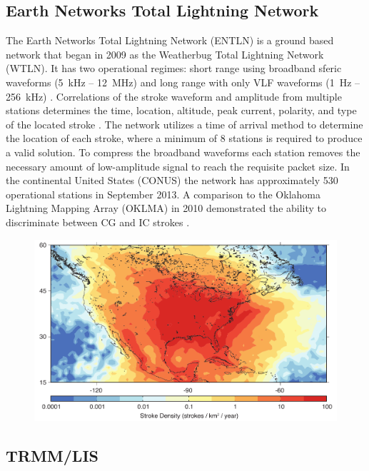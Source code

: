 \subsection{Earth Networks Total Lightning Network}

The Earth Networks Total Lightning Network (ENTLN) is a ground based network that began in 2009 as the Weatherbug Total Lightning Network (WTLN).
It has two operational regimes: short range using broadband sferic waveforms (5~kHz -- 12~MHz) and long range with only VLF waveforms (1~Hz -- 256~kHz) \citep{Heckman2010}.
Correlations of the stroke waveform and amplitude from multiple stations determines the time, location, altitude, peak current, polarity, and type of the located stroke \citep{Liu2011a}.
The network utilizes a time of arrival method to determine the location of each stroke, where a minimum of 8 stations is required to produce a valid solution.
To compress the broadband waveforms each station removes the necessary amount of low-amplitude signal to reach the requisite packet size.
In the continental United States (CONUS) the network has approximately 530 operational stations in September 2013.
A comparison to the Oklahoma Lightning Mapping Array (OKLMA) in 2010 demonstrated the ability to discriminate between CG and IC strokes \citep{Beasley2010}.

\begin{figure}[ht!]
	\centering
	\includegraphics[scale=1]{Introduction/Figures/entln_density.pdf}\\
	\caption{ }
	\label{intro:fig:entln}
\end{figure}

\subsection{TRMM/LIS}

